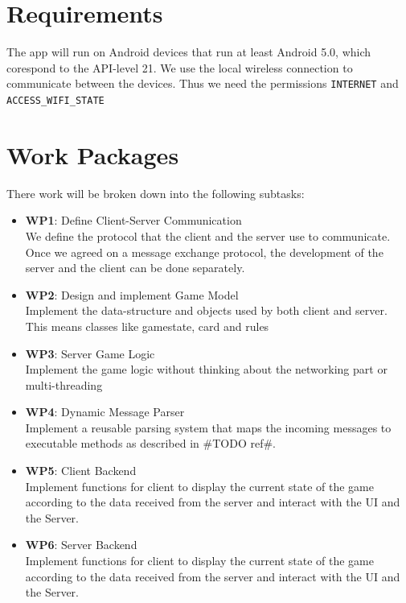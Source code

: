 \documentclass{report}
\begin{document}
\section{Requirements}
The app will run on Android devices that run at least Android 5.0, which corespond to the API-level 21. We use the local wireless connection to communicate between the devices. Thus we need the permissions \verb|INTERNET| and \verb|ACCESS_WIFI_STATE|

\section{Work Packages}
There work will be broken down into the following subtasks:

\begin{itemize}
	
        \item {\bf WP1}: Define Client-Server Communication\\
        We define the protocol that the client and the server use to communicate. Once we agreed on a message exchange protocol, the development of the server and the client can be done separately.
        
        \item {\bf WP2}: Design and implement Game Model\\
        Implement the data-structure and objects used by both client and server. This means classes like gamestate, card and rules
        
        \item {\bf WP3}: Server Game Logic\\
        Implement the game logic without thinking about the networking part or multi-threading
        
        \item {\bf WP4}: Dynamic Message Parser\\
		Implement a reusable parsing system that maps the incoming messages to executable methods as described in \#TODO ref\#.
           
        \item {\bf WP5}: Client Backend\\
		Implement functions for client to display the current state of the game according to the data received from the server and interact with the UI and the Server.
		
		\item {\bf WP6}: Server Backend\\
		Implement functions for client to display the current state of the game according to the data received from the server and interact with the UI and the Server.
		

\end{itemize}
\end{document}

